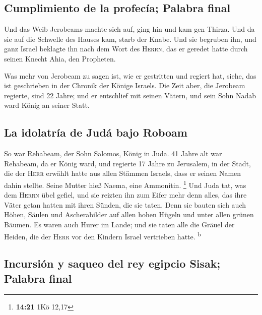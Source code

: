 \hypertarget{cumplimiento-de-la-profecuxeda-palabra-final}{%
\subsection{Cumplimiento de la profecía; Palabra
final}\label{cumplimiento-de-la-profecuxeda-palabra-final}}

 Und das Weib Jerobeams machte sich auf, ging hin und kam
gen Thirza. Und da sie auf die Schwelle des Hauses kam, starb der Knabe.
 Und sie begruben ihn, und ganz Israel beklagte ihn nach
dem Wort des \textsc{Herrn}, das er geredet hatte durch seinen Knecht
Ahia, den Propheten.

 Was mehr von Jerobeam zu sagen ist, wie er gestritten
und regiert hat, siehe, das ist geschrieben in der Chronik der Könige
Israels.  Die Zeit aber, die Jerobeam regierte, sind 22
Jahre; und er entschlief mit seinen Vätern, und sein Sohn Nadab ward
König an seiner Statt.

\hypertarget{la-idolatruxeda-de-juduxe1-bajo-roboam}{%
\subsection{La idolatría de Judá bajo
Roboam}\label{la-idolatruxeda-de-juduxe1-bajo-roboam}}

 So war Rehabeam, der Sohn Salomos, König in Juda. 41
Jahre alt war Rehabeam, da er König ward, und regierte 17 Jahre zu
Jerusalem, in der Stadt, die der \textsc{Herr} erwählt hatte aus allen
Stämmen Israels, dass er seinen Namen dahin stellte. Seine Mutter hieß
Naema, eine Ammonitin. \footnote{\textbf{14:21} 1Kö 12,17}
 Und Juda tat, was dem \textsc{Herrn} übel gefiel, und
sie reizten ihn zum Eifer mehr denn alles, das ihre Väter getan hatten
mit ihren Sünden, die sie taten.  Denn sie bauten sich
auch Höhen, Säulen und Ascherabilder auf allen hohen Hügeln und unter
allen grünen Bäumen.  Es waren auch Hurer im Lande; und
sie taten alle die Gräuel der Heiden, die der \textsc{Herr} vor den
Kindern Israel vertrieben hatte. \textsuperscript{b}

\hypertarget{incursiuxf3n-y-saqueo-del-rey-egipcio-sisak-palabra-final}{%
\subsection{Incursión y saqueo del rey egipcio Sisak; Palabra
final}\label{incursiuxf3n-y-saqueo-del-rey-egipcio-sisak-palabra-final}}

